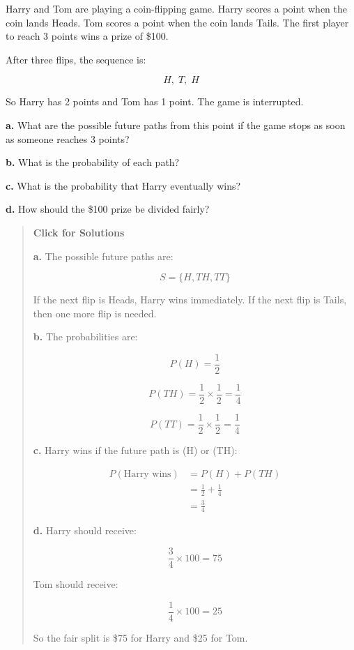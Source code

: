 \documentclass[
  letterpaper,
  DIV=11,
  numbers=noendperiod]{scrreprt}
\begin{document}
\begin{tcolorbox}[enhanced jigsaw, arc=.35mm, bottomrule=.15mm, bottomtitle=1mm, breakable, colback=white, colbacktitle=quarto-callout-note-color!10!white, colframe=quarto-callout-note-color-frame, coltitle=black, left=2mm, leftrule=.75mm, opacityback=0, opacitybacktitle=0.6, rightrule=.15mm, title=\textcolor{quarto-callout-note-color}{\faInfo}\hspace{0.5em}{Question 8}, titlerule=0mm, toprule=.15mm, toptitle=1mm]

Harry and Tom are playing a coin-flipping game. Harry scores a point
when the coin lands Heads. Tom scores a point when the coin lands Tails.
The first player to reach 3 points wins a prize of \$100.

After three flips, the sequence is:

\[
H,\;T,\;H
\]

So Harry has 2 points and Tom has 1 point. The game is interrupted.

\textbf{a.} What are the possible future paths from this point if the
game stops as soon as someone reaches 3 points?

\textbf{b.} What is the probability of each path?

\textbf{c.} What is the probability that Harry eventually wins?

\textbf{d.} How should the \$100 prize be divided fairly?

\begin{quote}
\textbf{Click for Solutions}

\textbf{a.} The possible future paths are:

\[
S = \{H,TH,TT\}
\]

If the next flip is Heads, Harry wins immediately. If the next flip is
Tails, then one more flip is needed.

\textbf{b.} The probabilities are:

\[
P(H)=\frac{1}{2}
\]

\[
P(TH)=\frac{1}{2}\times\frac{1}{2}=\frac{1}{4}
\]

\[
P(TT)=\frac{1}{2}\times\frac{1}{2}=\frac{1}{4}
\]

\textbf{c.} Harry wins if the future path is (H) or (TH):

\[
\begin{aligned}
P(\text{Harry wins})
&= P(H)+P(TH) \\
&= \frac{1}{2}+\frac{1}{4} \\
&= \frac{3}{4}
\end{aligned}
\]

\textbf{d.} Harry should receive:

\[
\frac{3}{4}\times 100 = 75
\]

Tom should receive:

\[
\frac{1}{4}\times 100 = 25
\]

So the fair split is \$75 for Harry and \$25 for Tom.
\end{quote}

\end{tcolorbox}
\end{document}

